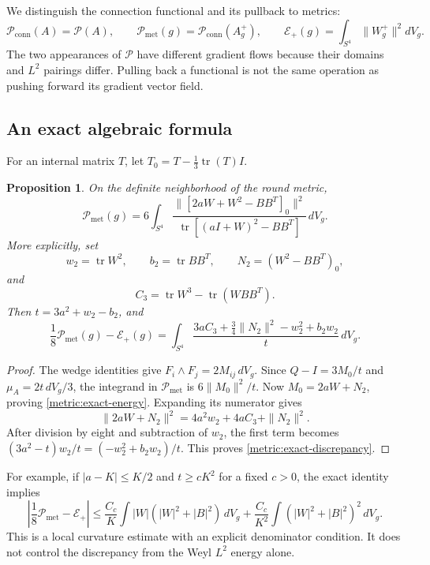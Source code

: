 \documentclass[11pt]{article}
\numberwithin{equation}{section}
\newtheorem{proposition}[theorem]{Proposition}
\theoremstyle{definition}
\theoremstyle{remark}
\begin{document}
We distinguish the connection functional and its pullback to metrics:
\begin{equation}\label{metric:functionals}
 \mathcal P_{\mathrm{conn}}(A)=\mathcal P(A),
 \qquad
 \mathcal P_{\mathrm{met}}(g)=\mathcal P_{\mathrm{conn}}(A_g^+),
 \qquad
 \mathcal E_+(g)=\int_{S^4}\|W_g^+\|^2dV_g.
\end{equation}
The two appearances of $\mathcal P$ have different gradient flows because
their domains and $L^2$ pairings differ. Pulling back a functional is not
the same operation as pushing forward its gradient vector field.

\subsection{An exact algebraic formula}

For an internal matrix $T$, let $T_0=T-\tfrac13\operatorname{tr}(T)I$.

\begin{proposition}\label{prop:metric-exact-energy}
On the definite neighborhood of the round metric,
\begin{equation}\label{metric:exact-energy}
 \mathcal P_{\mathrm{met}}(g)
 =6\int_{S^4}
 \frac{\|[2aW+W^2-BB^T]_0\|^2}
 {\operatorname{tr}[(aI+W)^2-BB^T]}\,dV_g.
\end{equation}
More explicitly, set
\[
 w_2=\operatorname{tr}W^2,\qquad
 b_2=\operatorname{tr}BB^T,\qquad
 N_2=(W^2-BB^T)_0,
\]
and
\[
 C_3=\operatorname{tr}W^3-\operatorname{tr}(WBB^T).
\]
Then $t=3a^2+w_2-b_2$, and
\begin{equation}\label{metric:exact-discrepancy}
 \frac18\mathcal P_{\mathrm{met}}(g)-\mathcal E_+(g)
 =\int_{S^4}
 \frac{3aC_3+\tfrac34\|N_2\|^2-w_2^2+b_2w_2}{t}\,dV_g.
\end{equation}
\end{proposition}

\begin{proof}
The wedge identities give
$F_i\wedge F_j=2M_{ij}\,dV_g$. Since
$Q-I=3M_0/t$ and $\mu_A=2t\,dV_g/3$, the integrand in
$\mathcal P_{\mathrm{met}}$ is $6\|M_0\|^2/t$.
Now $M_0=2aW+N_2$, proving \eqref{metric:exact-energy}.
Expanding its numerator gives
\[
 \|2aW+N_2\|^2=4a^2w_2+4aC_3+\|N_2\|^2.
\]
After division by eight and subtraction of $w_2$, the first term becomes
$(3a^2-t)w_2/t=(-w_2^2+b_2w_2)/t$. This proves
\eqref{metric:exact-discrepancy}.
\end{proof}

For example, if $|a-K|\leq K/2$ and $t\geq cK^2$ for a fixed
$c>0$, the exact identity implies
\begin{equation}\label{metric:discrepancy-bound}
 \left|\frac18\mathcal P_{\mathrm{met}}-\mathcal E_+\right|
 \leq \frac{C_c}{K}\int |W|(|W|^2+|B|^2)\,dV_g
 +\frac{C_c}{K^2}\int (|W|^2+|B|^2)^2\,dV_g.
\end{equation}
This is a local curvature estimate with an explicit denominator
condition. It does not control the discrepancy from the Weyl $L^2$
energy alone.
\end{document}
